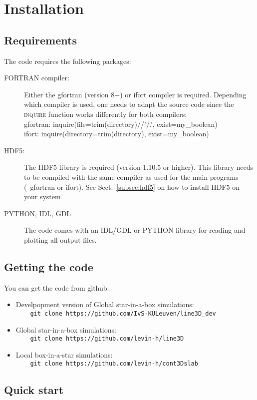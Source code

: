 \documentclass[10pt,a4paper]{article}
\begin{document}
\section{Installation}
\subsection{Requirements}
The code requires the following packages:
\begin{description}
\item[\textsc{FORTRAN} compiler:] Either the gfortran (version  8+) or ifort compiler is required. Depending which compiler is used, one needs to adapt the source code since the \textsc{inquire} function works differently for both compilers:
  \\
  gfortran: inquire(file=trim(directory)//'/.', exist=my\_boolean)
  \\
  ifort: inquire(directory=trim(directory), exist=my\_boolean)
\item[\textsc{HDF5}:] The HDF5 library is required (version 1.10.5 or higher). This library needs to be compiled with the same compiler as used for the main programs (\ie~gfortran or ifort). See Sect.~\ref{subsec:hdf5} on how to install HDF5 on your system
  \item[\textsc{PYTHON, IDL, GDL}] The code comes with an IDL/GDL or PYTHON library for reading and plotting all output files.
\end{description}  
\subsection{Getting the code}
You can get the code from github:
\begin{itemize}
  \item Develpopment version of Global star-in-a-box simulations:\\
    \verb|    git clone https://github.com/IvS-KULeuven/line3D_dev|
  \item Global star-in-a-box simulations:\\
    \verb|    git clone https://github.com/levin-h/line3D|
  \item Local box-in-a-star simulations:\\
    \verb|    git clone https://github.com/levin-h/cont3Dslab|
\end{itemize}
%
%
%
\subsection{Quick start}
\end{document}
